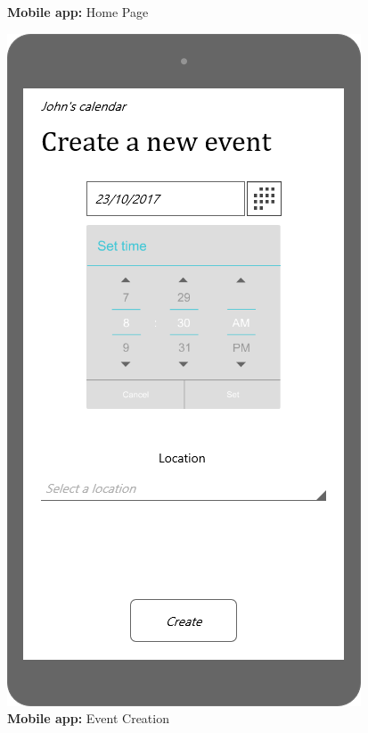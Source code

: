 \documentclass{article}
\begin{document}
\begin{figure}[H]
			\caption{\textbf{Mobile app:} Home Page}\label{fig:MU3}
			\endminipage\hfill
			\includegraphics[width=\linewidth]{Images/Mockup/Mobile/04-Create_an_event.png}
  			\caption{\textbf{Mobile app:} Event Creation}\label{fig:MU4}
			\endminipage \hfill

\end{figure}
\end{document}
